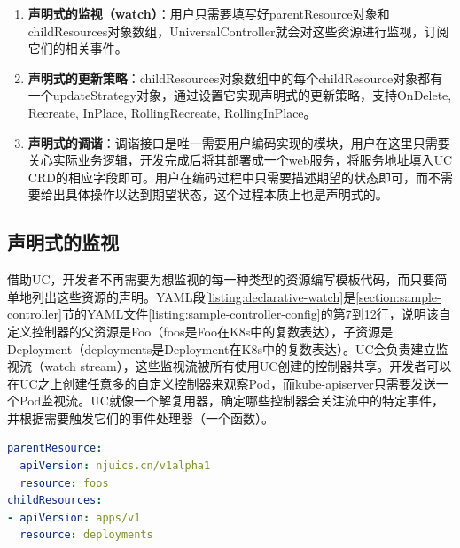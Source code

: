 \documentclass[macfonts,master]{njuthesis}
\begin{document}
\begin{enumerate}
	\item \textbf{声明式的监视（watch）}：用户只需要填写好parentResource对象和childResources对象数组，UniversalController就会对这些资源进行监视，订阅它们的相关事件。
	\item \textbf{声明式的更新策略}：childResources对象数组中的每个childResource对象都有一个updateStrategy对象，通过设置它实现声明式的更新策略，支持OnDelete, Recreate, InPlace, RollingRecreate, RollingInPlace。
	\item \textbf{声明式的调谐}：调谐接口是唯一需要用户编码实现的模块，用户在这里只需要关心实际业务逻辑，开发完成后将其部署成一个web服务，将服务地址填入UC CRD的相应字段即可。用户在编码过程中只需要描述期望的状态即可，而不需要给出具体操作以达到期望状态，这个过程本质上也是声明式的。
\end{enumerate}

\subsection{声明式的监视}

借助UC，开发者不再需要为想监视的每一种类型的资源编写模板代码，而只要简单地列出这些资源的声明。YAML段\ref{listing:declarative-watch}是\ref{section:sample-controller}节的YAML文件\ref{listing:sample-controller-config}的第7到12行，说明该自定义控制器的父资源是Foo（foos是Foo在K8s中的复数表达），子资源是Deployment（deployments是Deployment在K8s中的复数表达）。UC会负责建立监视流（watch stream），这些监视流被所有使用UC创建的控制器共享。开发者可以在UC之上创建任意多的自定义控制器来观察Pod，而kube-apiserver只需要发送一个Pod监视流。UC就像一个解复用器，确定哪些控制器会关注流中的特定事件，并根据需要触发它们的事件处理器（一个函数）。
\begin{lstlisting}[language=yaml,caption=声明式的监视,label=listing:declarative-watch]
parentResource:
  apiVersion: njuics.cn/v1alpha1
  resource: foos
childResources:
- apiVersion: apps/v1
  resource: deployments
\end{lstlisting}
\end{document}
